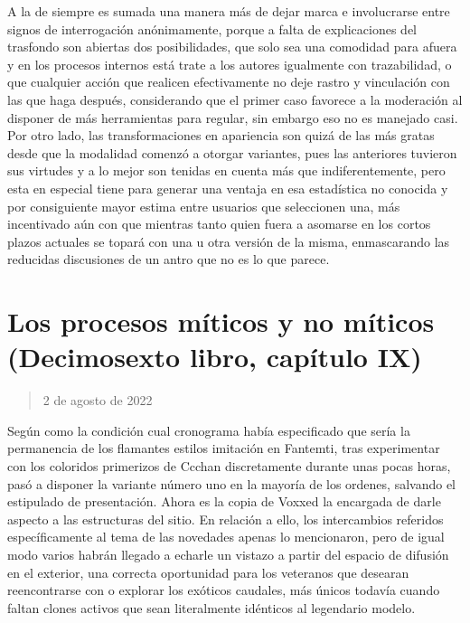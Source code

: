 \documentclass[
]{book}
\begin{document}
A la de siempre es sumada una manera más de dejar marca e involucrarse entre signos de interrogación anónimamente, porque a falta de explicaciones del trasfondo son abiertas dos posibilidades, que solo sea una comodidad para afuera y en los procesos internos está trate a los autores igualmente con trazabilidad, o que cualquier acción que realicen efectivamente no deje rastro y vinculación con las que haga después, considerando que el primer caso favorece a la moderación al disponer de más herramientas para regular, sin embargo eso no es manejado casi. Por otro lado, las transformaciones en apariencia son quizá de las más gratas desde que la modalidad comenzó a otorgar variantes, pues las anteriores tuvieron sus virtudes y a lo mejor son tenidas en cuenta más que indiferentemente, pero esta en especial tiene para generar una ventaja en esa estadística no conocida y por consiguiente mayor estima entre usuarios que seleccionen una, más incentivado aún con que mientras tanto quien fuera a asomarse en los cortos plazos actuales se topará con una u otra versión de la misma, enmascarando las reducidas discusiones de un antro que no es lo que parece.

\hypertarget{los-procesos-muxedticos-y-no-muxedticos-decimosexto-libro-capuxedtulo-ix}{%
\section{Los procesos míticos y no míticos (Decimosexto libro, capítulo IX)}\label{los-procesos-muxedticos-y-no-muxedticos-decimosexto-libro-capuxedtulo-ix}}

\begin{quote}
2 de agosto de 2022
\end{quote}

Según como la condición cual cronograma había especificado que sería la permanencia de los flamantes estilos imitación en Fantemti, tras experimentar con los coloridos primerizos de Ccchan discretamente durante unas pocas horas, pasó a disponer la variante número uno en la mayoría de los ordenes, salvando el estipulado de presentación. Ahora es la copia de Voxxed la encargada de darle aspecto a las estructuras del sitio. En relación a ello, los intercambios referidos específicamente al tema de las novedades apenas lo mencionaron, pero de igual modo varios habrán llegado a echarle un vistazo a partir del espacio de difusión en el exterior, una correcta oportunidad para los veteranos que desearan reencontrarse con o explorar los exóticos caudales, más únicos todavía cuando faltan clones activos que sean literalmente idénticos al legendario modelo.
\end{document}
